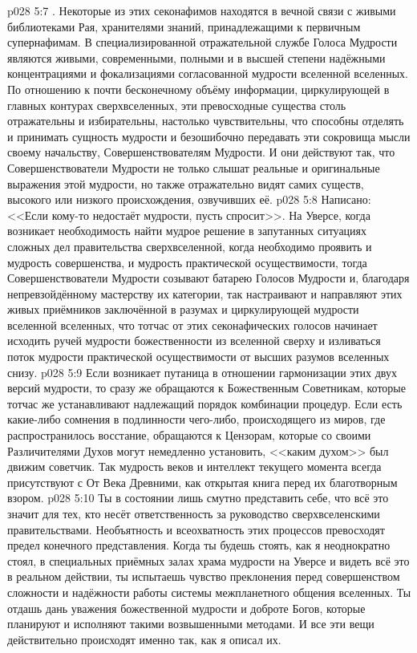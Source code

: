 \vs p028 5:7 . Некоторые из этих секонафимов находятся в вечной связи с живыми библиотеками Рая, хранителями знаний, принадлежащими к первичным супернафимам. В специализированной отражательной службе Голоса Мудрости являются живыми, современными, полными и в высшей степени надёжными концентрациями и фокализациями согласованной мудрости вселенной вселенных. По отношению к почти бесконечному объёму информации, циркулирующей в главных контурах сверхвселенных, эти превосходные существа столь отражательны и избирательны, настолько чувствительны, что способны отделять и принимать сущность мудрости и безошибочно передавать эти сокровища мысли своему начальству, Совершенствователям Мудрости. И они действуют так, что Совершенствователи Мудрости не только слышат реальные и оригинальные выражения этой мудрости, но также отражательно видят самих существ, высокого или низкого происхождения, озвучивших её.
\vs p028 5:8 Написано: <<Если кому\hyp{}то недостаёт мудрости, пусть спросит>>. На Уверсе, когда возникает необходимость найти мудрое решение в запутанных ситуациях сложных дел правительства сверхвселенной, когда необходимо проявить и мудрость совершенства, и мудрость практической осуществимости, тогда Совершенствователи Мудрости созывают батарею Голосов Мудрости и, благодаря непревзойдённому мастерству их категории, так настраивают и направляют этих живых приёмников заключённой в разумах и циркулирующей мудрости вселенной вселенных, что тотчас от этих секонафических голосов начинает исходить ручей мудрости божественности из вселенной сверху и изливаться поток мудрости практической осуществимости от высших разумов вселенных снизу.
\vs p028 5:9 Если возникает путаница в отношении гармонизации этих двух версий мудрости, то сразу же обращаются к Божественным Советникам, которые тотчас же устанавливают надлежащий порядок комбинации процедур. Если есть какие\hyp{}либо сомнения в подлинности чего\hyp{}либо, происходящего из миров, где распространилось восстание, обращаются к Цензорам, которые со своими Различителями Духов могут немедленно установить, <<каким духом>> был движим советчик. Так мудрость веков и интеллект текущего момента всегда присутствуют с От Века Древними, как открытая книга перед их благотворным взором.
\vs p028 5:10 Ты в состоянии лишь смутно представить себе, что всё это значит для тех, кто несёт ответственность за руководство сверхвселенскими правительствами. Необъятность и всеохватность этих процессов превосходят предел конечного представления. Когда ты будешь стоять, как я неоднократно стоял, в специальных приёмных залах храма мудрости на Уверсе и видеть всё это в реальном действии, ты испытаешь чувство преклонения перед совершенством сложности и надёжности работы системы межпланетного общения вселенных. Ты отдашь дань уважения божественной мудрости и доброте Богов, которые планируют и исполняют такими возвышенными методами. И все эти вещи действительно происходят именно так, как я описал их.
